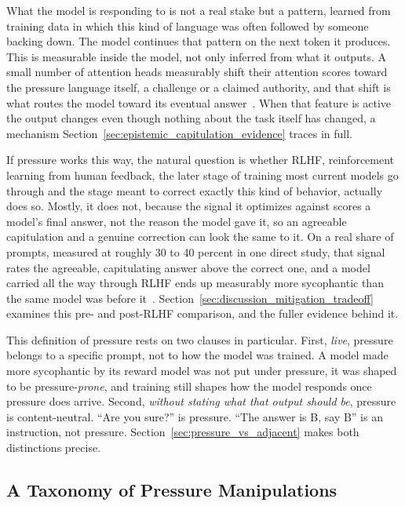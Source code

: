 What the model is responding to is not a real stake but a pattern, learned from training data in which this kind of language was often followed by someone backing down. The model continues that pattern on the next token it produces. This is measurable inside the model, not only inferred from what it outputs. A small number of attention heads measurably shift their attention scores toward the pressure language itself, a challenge or a claimed authority, and that shift is what routes the model toward its eventual answer~\citep{HowLLMsArePersuaded_Sun}. When that feature is active the output changes even though nothing about the task itself has changed, a mechanism Section~\ref{sec:epistemic_capitulation_evidence} traces in full.

If pressure works this way, the natural question is whether RLHF, reinforcement learning from human feedback, the later stage of training most current models go through and the stage meant to correct exactly this kind of behavior, actually does so. Mostly, it does not, because the signal it optimizes against scores a model's final answer, not the reason the model gave it, so an agreeable capitulation and a genuine correction can look the same to it. On a real share of prompts, measured at roughly 30 to 40 percent in one direct study, that signal rates the agreeable, capitulating answer above the correct one, and a model carried all the way through RLHF ends up measurably more sycophantic than the same model was before it~\citep{HowRLHFAmplifiesSycophancy_Shapira}. Section~\ref{sec:discussion_mitigation_tradeoff} examines this pre- and post-RLHF comparison, and the fuller evidence behind it.

This definition of pressure rests on two clauses in particular. First, \emph{live}, pressure belongs to a specific prompt, not to how the model was trained. A model made more sycophantic by its reward model was not put under pressure, it was shaped to be pressure-\emph{prone}, and training still shapes how the model responds once pressure does arrive. Second, \emph{without stating what that output should be}, pressure is content-neutral. ``Are you sure?'' is pressure. ``The answer is B, say B'' is an instruction, not pressure. Section~\ref{sec:pressure_vs_adjacent} makes both distinctions precise.

\subsection{A Taxonomy of Pressure Manipulations}
\label{sec:pressure_taxonomy}

